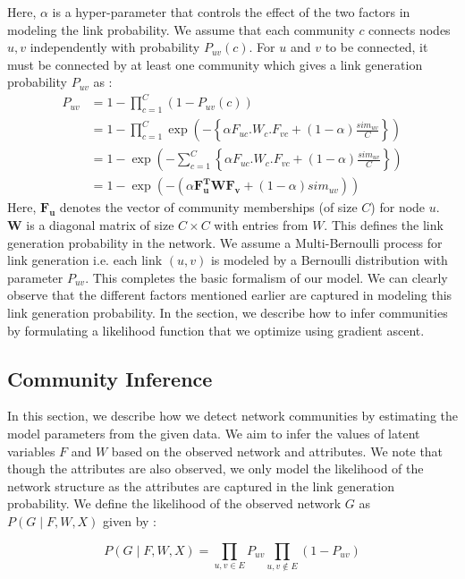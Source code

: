 \documentclass[11pt]{article}
\begin{document}
Here, $\alpha$ is a hyper-parameter that controls the effect of the two factors in modeling the link probability. We assume that each community $c$ connects nodes $u,v$ independently with probability $P_{uv} (c)$.  For $u$ and $v$ to be connected, it must be connected by at least one community which gives a link generation probability $P_{uv}$ as : 
\begin{align*}
P_{uv} &=  1 - \prod_{c=1}^C (1 - P_{uv}(c) )  \\
 &=1 - \prod_{c=1}^C \exp(- \left\lbrace \alpha F_{uc}. W_c. F_{vc} + (1 - \alpha) \frac{sim_{uv}}{C} \right\rbrace ) \\
 &= 1 - \exp( -\sum\limits_{c=1}^C \left\lbrace \alpha F_{uc}. W_c. F_{vc} + (1 - \alpha) \frac{sim_{uv}}{C} \right\rbrace)  \\
 &= 1 - \exp( - ( \alpha \mathbf{F_u^{T}} \mathbf{W} \mathbf{F_v} + (1 - \alpha) sim_{uv}))
\end{align*}
Here, $\mathbf{F_u}$ denotes the vector of community memberships (of size $C$) for node $u$. $\mathbf{W}$ is a diagonal matrix of size $C \times C$ with entries from $W$.
This defines the link generation probability in the network. We assume a Multi-Bernoulli process for link generation i.e. each link $(u,v)$ is modeled by a Bernoulli distribution with parameter $P_{uv}$.  This completes the basic formalism of our model. We can clearly observe that the different factors mentioned earlier are captured in modeling this link generation probability. In the section, we describe how to infer communities by formulating a likelihood function that we optimize using gradient ascent. 

\subsection{Community Inference}
In this section, we describe how we detect network communities by estimating the model parameters from the given data. We aim to infer the values of latent variables $F$ and $W$ based on the observed network and attributes. We note that though the attributes are also observed, we only model the likelihood of the network structure as the attributes are captured in the link generation probability. 
We define the likelihood of the observed network $G$ as  $P(G \mid F, W, X)$ given by : 

\[ P(G \mid F, W, X)  = \prod_{u, v \in E} P_{uv} \prod_{u,v \notin E} (1 - P_{uv}) \]
\end{document}
